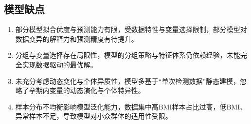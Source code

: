 \documentclass[withoutpreface,bwprint]{cumcmthesis} %
\begin{document}
\subsection{模型缺点}
\begin{enumerate}
    \item 部分模型拟合优度与预测能力有限，受数据特性与变量选择限制，部分模型对数据变异的解释力和预测精度有待提升。
    \item 分组与变量选择存在局限性，模型的分组策略与特征体系仍依赖经验，未能完全实现数据驱动的最优解。
    \item 未充分考虑动态变化与个体异质性，模型多基于“单次检测数据”静态建模，忽略了孕期内变量的动态演化与个体特异性。
    \item 样本分布不均衡影响模型泛化能力，数据集中高BMI样本占比过高，低BMI、异常样本不足，导致模型对小众群体的适用性受限。
\end{enumerate}




\end{document}
